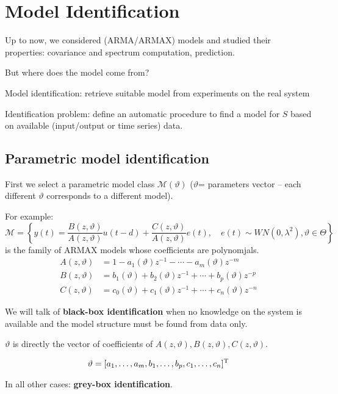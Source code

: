 \section{Model Identification}

Up to now, we considered (ARMA/ARMAX) models and studied their properties: covariance and spectrum computation, prediction.

But where does the model come from?

Model identification: retrieve suitable model from experiments on the real system 


Identification problem: define an automatic procedure to find a model for $S$ based on available (input/output or time series) data.


\subsection{Parametric model identification}

First we select a parametric model class $\mathcal{M}(\vartheta)$ ($\vartheta$= parameters vector – each different $\vartheta$ corresponds to a different model).

For example:
$$
	\mathcal{M}=\left\{y(t)=\frac{B(z, \vartheta)}{A(z, \vartheta)} u(t-d)+\frac{C(z, \vartheta)}{A(z, \vartheta)} e(t), \quad e(t) \sim WN\left(0, \lambda^{2}\right), \vartheta\in\Theta\right\}
$$
is the family of ARMAX models whose coefficients are polynomjals.
\begin{align*}
	A(z, \vartheta)&=1-a_{1}(\vartheta) z^{-1}-\cdots-a_{m}(\vartheta) z^{-m} \\
	B(z, \vartheta)&=b_{1}(\vartheta)+b_{2}(\vartheta) z^{-1}+\cdots+b_{p}(\vartheta) z^{-p}\\
	C(z, \vartheta)&=c_0(\vartheta)+c_{1}(\vartheta) z^{-1}+\cdots+c_{n}(\vartheta) z^{-n}
\end{align*}

We will talk of \textbf{black-box identification} when no knowledge on the system is available and the model structure must be found from data only.

$\vartheta$ is directly the vector of coefficients of $A(z, \vartheta),B(z, \vartheta),C(z, \vartheta)$.

$$
	\vartheta=[a_{1},\ldots,a_{m},b_{1},\ldots,b_{p},c_{1},\ldots,c_{n}]^{\mathrm{T}}
$$

In all other cases: \textbf{grey-box identification}.

